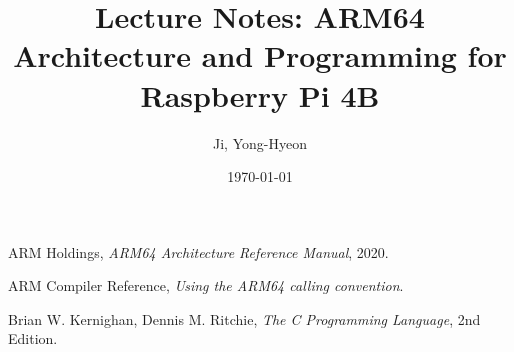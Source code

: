\documentclass[12pt]{article}
\begin{document}
	
	\title{Lecture Notes: ARM64 Architecture and Programming for Raspberry Pi 4B}
	\author{Ji, Yong-Hyeon}
	\date{\today}
	\maketitle
	
	\tableofcontents  %
	\newpage
	
%	
	
	
	\newpage
	
	
	
	\begin{thebibliography}{99}
		ARM Holdings, \textit{ARM64 Architecture Reference Manual}, 2020.
		
		ARM Compiler Reference, \textit{Using the ARM64 calling convention}.
		
		Brian W. Kernighan, Dennis M. Ritchie, \textit{The C Programming Language}, 2nd Edition.
	\end{thebibliography}
	
	
\end{document}
